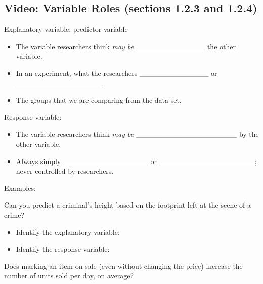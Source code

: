 \documentclass[
]{report}
\providecommand{\tightlist}{%
  \setlength{\itemsep}{0pt}\setlength{\parskip}{0pt}}
\begin{document}
\subsection*{Video: Variable Roles (sections 1.2.3 and 1.2.4)}\label{video-variable-roles-sections-1.2.3-and-1.2.4}


Explanatory variable: predictor variable

\begin{itemize}
\item
  The variable researchers think \emph{may be} \_\_\_\_\_\_\_\_\_\_\_\_\_ the other variable.
\item
  In an experiment, what the researchers \_\_\_\_\_\_\_\_\_\_\_\_\_ or \_\_\_\_\_\_\_\_\_\_\_\_\_\_\_\_.
\item
  The groups that we are comparing from the data set.
\end{itemize}

Response variable:

\begin{itemize}
\item
  The variable researchers think \emph{may be} \_\_\_\_\_\_\_\_\_\_\_\_\_\_\_\_\_\_\_ by the other variable.
\item
  Always simply \_\_\_\_\_\_\_\_\_\_\_\_\_\_\_\_ or \_\_\_\_\_\_\_\_\_\_\_\_\_\_\_\_\_\_; never controlled by researchers.
\end{itemize}


Examples:

Can you predict a criminal's height based on the footprint left at the scene of a crime?

\begin{itemize}
\tightlist
\item
  Identify the explanatory variable:
\end{itemize}

\vspace{0.25in}

\begin{itemize}
\tightlist
\item
  Identify the response variable:
\end{itemize}

\vspace{0.25in}

Does marking an item on sale (even without changing the price) increase the number of units sold per day, on average?
\end{document}
